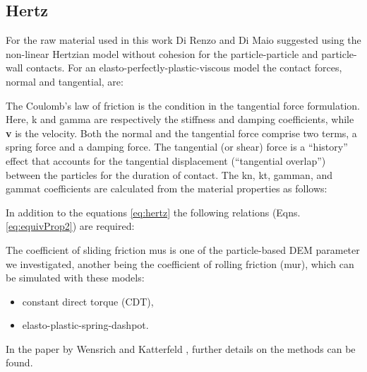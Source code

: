 \subsection{Hertz}
\label{subsec:hertz}

For the raw material used in this work 
Di Renzo and Di Maio \cite{RefWorks:145} suggested using the non-linear
Hertzian model without cohesion for the particle-particle and particle-wall contacts. 
For an elasto-perfectly-plastic-viscous model the contact forces, normal and
tangential, are:


The Coulomb's law of friction is the condition in the tangential force
formulation.\\
Here, \acs{k} and \acs{gamma} are respectively the stiffness and damping
coefficients, while \textbf{v} is the velocity.
Both the normal and the tangential
force comprise two terms, a spring force and a damping force. 
The tangential (or shear) force is a ``history'' effect that accounts for the
tangential displacement (``tangential overlap'') between the particles for the
duration of contact.
The \acs{kn}, \acs{kt}, \acs{gamman}, and \acs{gammat} coefficients are
calculated from the material properties as follows:

In addition to the equations \ref{eq:hertz} the following relations (Eqns. \ref{eq:equivProp2}) are required:


The coefficient of sliding friction \acs{mus} is 
one of the particle-based \acs{DEM} parameter we investigated, 
another being the coefficient of rolling friction (\acs{mur}),
which can be simulated with these models:
\begin{itemize}
  \item{constant direct torque (CDT),}
  \item{elasto-plastic-spring-dashpot.}
\end{itemize}

In the paper by Wensrich and Katterfeld \cite{RefWorks:87}, further details on
the methods can be found.\\



% 


